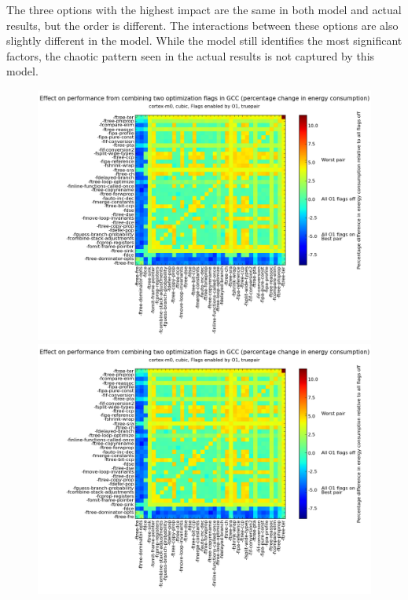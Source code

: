 \documentclass[twocolumn]{article}
\begin{document}
The three options with the highest impact are the same in both model and actual results, but the order is different. The interactions between these options are also slightly different in the model. While the model still identifies the most significant factors, the chaotic pattern seen in the actual results is not captured by this model.


\begin{figure}
	\centering
    \begin{minipage}[l]{0.98\columnwidth}
        \centering
		\includegraphics[width=1.0\linewidth, clip, trim= 8.8cm 0 4.8cm 2cm]{cortex-m0/o1cub_-7p5_10.png}
    \end{minipage}
    \hfill
    \begin{minipage}[l]{0.07\columnwidth}
        \centering
        \includegraphics[width=1.0\linewidth, clip, trim= 29.1cm 0 0cm 1.7cm]{cortex-m0/o1cub_-7p5_10.png}

\end{minipage}
\end{figure}
\end{document}
